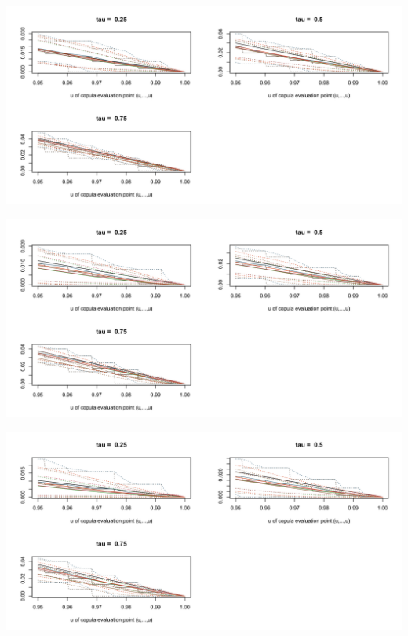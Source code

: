 \documentclass[12pt]{report}
\newcommand{\1}{\mathbf{1}}
\begin{document}
\begin{flushleft}
\begin{center}
\label{G_2d_s}
\includegraphics[width=17cm]{ExceedanceProb/G_2d_s.png}
\end{center}%

\begin{center}
\label{G_3d_s}
\includegraphics[width=17cm]{ExceedanceProb/G_3d_s.png}
\end{center}%

\begin{center}
\label{G_4d_s}
\includegraphics[width=17cm]{ExceedanceProb/G_4d_s.png}
\end{center}%


\end{flushleft}
\end{document}
